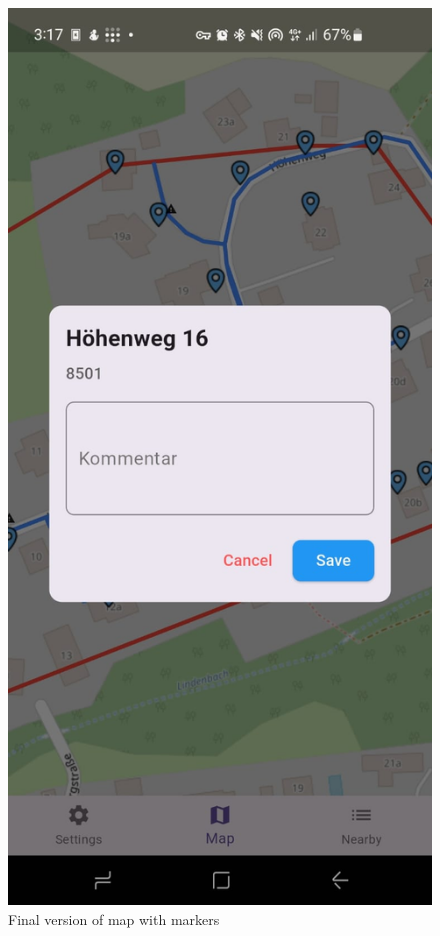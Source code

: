 \begin{figure}[H]
\begin{minipage}{0.3\textwidth}
    \end{minipage}
    \hspace{2cm}
    \begin{minipage}{0.3\textwidth}
        \centering
        \includegraphics[width=\textwidth]{images/paul/wireframes/finalDetails.jpeg}
        \caption{Final version of map with markers}
    \end{minipage}
\end{figure}

